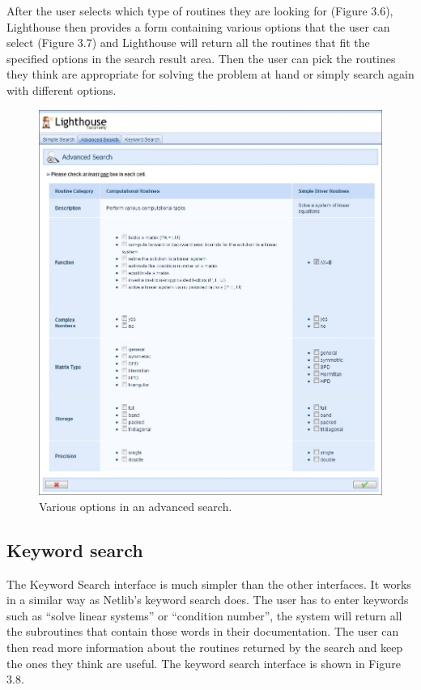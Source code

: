 After the user selects which type of routines they are looking for (Figure 3.6), Lighthouse then provides a form containing various options that the user can select (Figure 3.7) and Lighthouse will return all the routines that fit the specified options in the search result area. Then the user can pick the routines they think are appropriate for solving the problem at hand or simply search again with different options.

\begin{figure}[h!]\label{advancedsearch2}
  \centering
  \includegraphics[width=6.5in]{figs/advancedsearch2}
  \caption[Various options in an advanced search]
   {Various options in an advanced search.}
\end{figure}

\subsection{Keyword search}

The Keyword Search interface is much simpler than the other interfaces. It works in a similar way as Netlib's keyword search does. The user has to enter keywords such as ``solve linear systems'' or ``condition number'', the system will return all the subroutines that contain those words in their documentation. The user can then read more information about the routines returned by the search and keep the ones they think are useful. The keyword search interface is shown in Figure 3.8.

